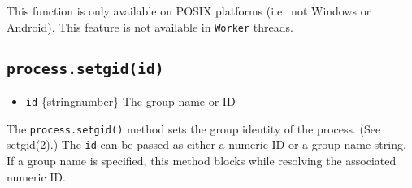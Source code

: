 \begin{Shaded}
\begin{Highlighting}[]
  \OperatorTok{=} \NormalTok{(}\NormalTok{)}\OperatorTok{;}

\NormalTok{ (} \OperatorTok{\&\&} \NormalTok{) \{}
  \NormalTok{(}\SpecialCharTok{$\{}\NormalTok{()}\SpecialCharTok{\}}\VerbatimStringTok{\textasciigrave{}}\NormalTok{)}\OperatorTok{;}
  \NormalTok{ \{}
    \NormalTok{(}\NormalTok{)}\OperatorTok{;}
    \NormalTok{(}\SpecialCharTok{$\{}\NormalTok{()}\SpecialCharTok{\}}\VerbatimStringTok{\textasciigrave{}}\NormalTok{)}\OperatorTok{;}
\NormalTok{  \} }
    \NormalTok{(}\SpecialCharTok{$\{}\SpecialCharTok{\}}\VerbatimStringTok{\textasciigrave{}}\NormalTok{)}\OperatorTok{;}
\NormalTok{  \}}
\NormalTok{\}}
\end{Highlighting}
\end{Shaded}

This function is only available on POSIX platforms (i.e.~not Windows or
Android). This feature is not available in
\href{worker_threads.md\#class-worker}{\texttt{Worker}} threads.

\subsection{\texorpdfstring{\texttt{process.setgid(id)}}{process.setgid(id)}}\label{process.setgidid}

\begin{itemize}
\tightlist
\item
  \texttt{id} \{string\textbar number\} The group name or ID
\end{itemize}

The \texttt{process.setgid()} method sets the group identity of the
process. (See setgid(2).) The \texttt{id} can be passed as either a
numeric ID or a group name string. If a group name is specified, this
method blocks while resolving the associated numeric ID.

